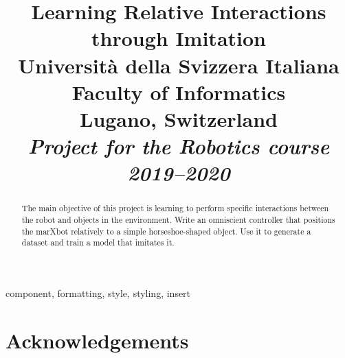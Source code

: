 \documentclass[conference]{IEEEtran}
\begin{document}
\title{Learning Relative Interactions through Imitation \\ \vspace{0.5\baselineskip}
{
	\large {Università della Svizzera Italiana}\\
	{Faculty of Informatics} \\
	Lugano, Switzerland \\
	\textit{Project for the Robotics course 2019--2020}\\
}
}

\author{
\and
{}
}

\maketitle

\begin{abstract}
The main objective of this project is learning to perform specific interactions between the robot and objects in the 
environment.
Write an omniscient controller that positions the marXbot relatively to a simple horseshoe-shaped object. Use it to 
generate a dataset and train a model that imitates it.
\end{abstract}

\begin{IEEEkeywords}
component, formatting, style, styling, insert
\end{IEEEkeywords}








\section*{Acknowledgements}




\end{document}
